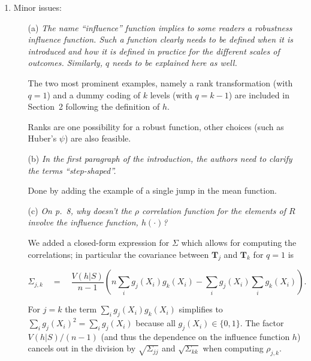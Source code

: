 \documentclass[11pt,a4paper]{article}
\begin{document}
\begin{enumerate}
  \item Minor issues:
  
  \begin{itemize}
  
    \item[(a)] \textit{The name ``influence'' function implies to some readers a
               robustness influence function. Such a function clearly needs to be
	       defined when it is introduced and how it is defined in practice
	       for the different scales of outcomes. Similarly, $q$ needs to be
	       explained here as well.}
	       
	       The two most prominent examples, namely a rank transformation
               (with $q = 1$) and a dummy coding of $k$ levels (with $q = k - 1$)
               are included in Section~2 following the definition of $h$. 
	       
	       Ranks are one possibility for a robust function, other choices
	       (such as Huber's $\psi$) are also feasible.
	       	       
    \item[(b)] \textit{In the first paragraph of the introduction, the authors need to
               clarify the terms ``step-shaped''.}
	       
	       Done by adding the example of a single jump in the mean function.
	       
    \item[(c)] \textit{On p.~8, why doesn't the $\rho$ correlation function for the
               elements of $R$ involve the influence function, $h(\cdot)$?}
	       
	       We added a closed-form expression for $\Sigma$ which allows
               for computing the correlations; in particular the covariance
               between $\mathbf{T}_j$ and $\mathbf{T}_k$ for $q = 1$ is

                 \[ \Sigma_{j,k} \quad = \quad \frac{V(h | S)}{n-1}
	            \left(n \sum_i g_j(X_i) g_k(X_i) - \sum_i g_j(X_i) \sum_i g_k(X_i)\right). \]
               
	       For $j = k$ the term $\sum_i g_j(X_i) g_k(X_i)$ simplifies to 
               $\sum_i g_j(X_i)^2 = \sum_i g_j(X_i)$ because all $g_j(X_i) \in \{0, 1\}$.
	       The factor $V(h | S) / (n-1)$ (and thus the dependence on the influence function $h$) 
               cancels out in the division
               by $\sqrt{\Sigma_{jj}}$ and $\sqrt{\Sigma_{kk}}$ when
               computing $\rho_{j,k}$.
	       

\end{itemize}
\end{enumerate}
\end{document}
